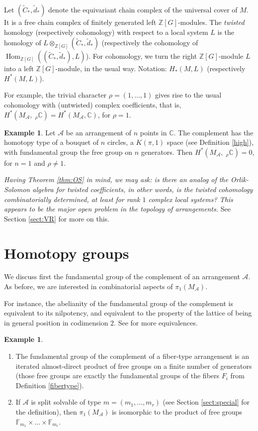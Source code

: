 \documentclass[psamsfonts]{conm-p-l}
\theoremstyle{definition}
\newtheorem{example}[theorem]{Example}
\theoremstyle{remark}
\numberwithin{equation}{section}
\newcommand{\A}{{\mathcal A}}
\newcommand{\Z}{\mathbb{Z}}
\newcommand{\C}{\mathbb{C}}
\newcommand{\F}{\mathbb{F}}
\DeclareMathOperator{\Hom}{Hom}
\begin{document}
Let $(\tilde{C}_*, \tilde{d}_*)$ denote the equivariant chain complex of the universal cover of $M$.
It is a free chain complex of finitely generated left $\Z[G]$-modules.
The {\em twisted}  homology (respectively cohomology) with respect to a local system $L$ 
is the homology of $L\otimes_{\Z[G]} (\tilde{C}_*, \tilde{d}_*)$
(respectively the cohomology of $\Hom_{\Z[G]} ((\tilde{C}_*, \tilde{d}_*), L)$). For cohomology,
we  turn the right $\Z[G]$-module $L$ into a
left $\Z[G]$-module, in the usual way. Notation: $H_*(M, L)$ (respectively $H^*(M, L)$). 

 
For example, the trivial character $\rho=(1, \dots, 1)$ gives rise to the usual cohomology with 
(untwisted) complex coefficients, that is, $H^*(M_{\A}, \;_{\rho}\C) = H^*(M_{\A}, \C)$, for $\rho =1$.

\begin{example}
\label{points}
Let $\A$ be an arrangement of $n$ points in $\C$. The complement has the homotopy type of a 
bouquet of $n$ circles, a $K(\pi,1)$ space (see Definition \ref{high}), with fundamental group 
the free group on $n$ generators. Then $H^*(M_{\A}, \;_{\rho}\C)=0$, for $n=1$ and $\rho \ne 1$.
\end{example}

{\it Having Theorem \textup{\ref{thm:OS}} in mind, we may ask: is there an analog 
of the Orlik-Solomon algebra for twisted coefficients, in other words, is the twisted 
cohomology combinatorially determined, at least for rank $1$ complex local systems?
This appears to be the major open problem in the topology of arrangements.} See
Section \ref{sect:VR} for more on this.
 
\section{Homotopy groups}
\label{sect:pi1}

We discuss first the fundamental group of 
the complement of an arrangement $\A$. As before, we are interested in combinatorial aspects
of $\pi_1(M_{\A})$.

For instance, the abelianity of the fundamental group of the complement is equivalent to 
its nilpotency, and equivalent to the property of the lattice of being 
in general position in codimension $2$. See \cite{Mac} for more equivalences.

\begin{example}
\label{fiber:pi1}
\begin{enumerate}
\item \label{Ftype}
The fundamental group of the complement of a fiber-type arrangement is 
an iterated almost-direct 
product of free groups on a finite number of generators (those free groups are exactly 
the fundamental groups of the  fibers $F_i$ from Definition \ref{fibertype}).
\item \label{Splitsolv}
If $\A$ is  split solvable of type $m=(m_1, \dots, m_r)$ (see Section \ref{sect:special}
for the definition), then $\pi_1(M_{\A})$ is isomorphic to the product of free groups 
$\F_{m_1} \times \dots \times \F_{m_r}$.
\end{enumerate}
\end{example}
\end{document}
